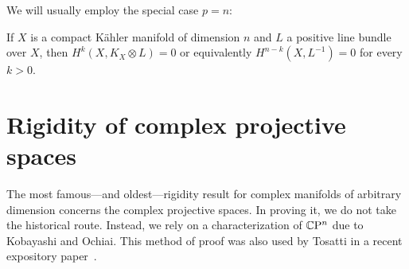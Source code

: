 We will usually employ the special case $p=n$:

\begin{cor}
	If $X$ is a compact K\"ahler manifold of dimension $n$ and $L$ a positive line bundle over $X$, then $H^k(X,K_X\otimes L)=0$ or equivalently $H^{n-k}(X,L^{-1})=0$ for every $k>0$.
\end{cor}

\section{Rigidity of complex projective spaces}

The most famous---and oldest---rigidity result for complex manifolds of arbitrary dimension concerns the complex projective spaces. In proving it, we do not take the historical route. Instead, we rely on a characterization of $\mathbb{C}\mathrm{P}^n$ due to Kobayashi and Ochiai. This method of proof was also used by Tosatti in a recent expository paper~\cite{Tos2017}.

